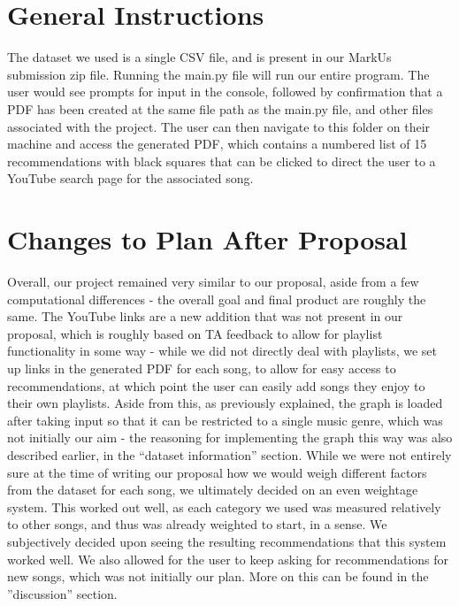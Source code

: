 \documentclass[fontsize=11pt]{article}
\begin{document}
\section*{General Instructions}

\hspace{\parindent} The dataset we used is a single CSV file, and is present in our MarkUs submission zip file. Running the main.py file will run our entire program. The user would see prompts for input in the console, followed by confirmation that a PDF has been created at the same file path as the main.py file, and other files associated with the project. The user can then navigate to this folder on their machine and access the generated PDF, which contains a numbered list of 15 recommendations with black squares that can be clicked to direct the user to a YouTube search page for the associated song.

\section*{Changes to Plan After Proposal}

\hspace{\parindent} Overall, our project remained very similar to our proposal, aside from a few computational differences - the overall goal and final product are roughly the same. The YouTube links are a new addition that was not present in our proposal, which is roughly based on TA feedback to allow for playlist functionality in some way - while we did not directly deal with playlists, we set up links in the generated PDF for each song, to allow for easy access to recommendations, at which point the user can easily add songs they enjoy to their own playlists. Aside from this, as previously explained, the graph is loaded after taking input so that it can be restricted to a single music genre, which was not initially our aim - the reasoning for implementing the graph this way was also described earlier, in the “dataset information” section. While we were not entirely sure at the time of writing our proposal how we would weigh different factors from the dataset for each song, we ultimately decided on an even weightage system. This worked out well, as each category we used was measured relatively to other songs, and thus was already weighted to start, in a sense. We subjectively decided upon seeing the resulting recommendations that this system worked well. We also allowed for the user to keep asking for recommendations for new songs, which was not initially our plan. More on this can be found in the ”discussion” section.
\end{document}
